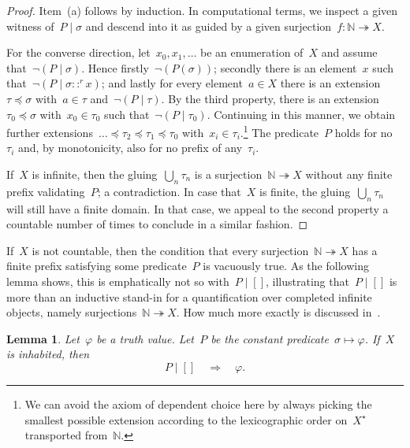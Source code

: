 \documentclass[com,11pt,crcready]{iosart2x}
\theoremstyle{definition}
\theoremstyle{plain}
\newtheorem{lemma}[definition]{Lemma}
\theoremstyle{remark}
\newcommand{\NN}{\mathbb{N}}
\renewcommand{\_}{\mathpunct{.}\,}
\begin{document}
\begin{proof}
Item~(a) follows by induction. In computational terms, we inspect a given
witness of~$P \mid \sigma$ and descend into it as guided by a given
surjection~$f : \NN \twoheadrightarrow X$.

For the converse direction, let~$x_0,x_1,\ldots$ be an enumeration of~$X$ and
assume that~$\neg(P \mid \sigma)$. Hence firstly~$\neg(P(\sigma))$; secondly there is an
element~$x$ such that~$\neg(P \mid \sigma ::^r x)$; and lastly for every element~$a
\in X$ there is an extension~$\tau \preceq \sigma$ with~$a \in \tau$
and~$\neg(P \mid \tau)$. By the third property,
there is an extension~$\tau_0 \preceq
\sigma$ with~$x_0 \in \tau_0$ such that~$\neg(P \mid \tau_0)$. Continuing in
this manner, we obtain further extensions~$\ldots \preceq \tau_2 \preceq \tau_1
\preceq \tau_0$ with~$x_i \in \tau_i$.\footnote{We can avoid the axiom of
dependent choice here by always picking the smallest possible extension
according to the lexicographic order on~$X^\star$ transported from~$\NN$.}
The predicate~$P$ holds for no~$\tau_i$ and, by monotonicity, also for no
prefix of any~$\tau_i$.

If~$X$ is infinite, then the gluing~$\bigcup_n \tau_n$ is a surjection~$\NN
\twoheadrightarrow X$ without any finite prefix validating~$P$; a
contradiction. In case that~$X$ is finite, the gluing~$\bigcup_n \tau_n$ will
still have a finite domain. In that case, we appeal to the second property a
countable number of times to conclude in a similar fashion.
\end{proof}

If~$X$ is not countable, then the condition that every surjection~$\NN
\twoheadrightarrow X$ has a finite prefix satisfying some predicate~$P$ is
vacuously true. As the following lemma shows, this is emphatically not so
with~$P \mid []$, illustrating that~$P \mid []$ is more than an inductive
stand-in for a quantification over completed infinite objects, namely
surjections~$\NN \twoheadrightarrow X$. How much more exactly is discussed
in~\cite{blechschmidt:multiverse}.

\begin{lemma}Let~$\varphi$ be a truth value. Let~$P$ be the constant
predicate~$\sigma \mapsto \varphi$. If~$X$ is inhabited, then
\[ P \mid [] \quad\Longrightarrow\quad \varphi. \]
\end{lemma}
\end{document}
